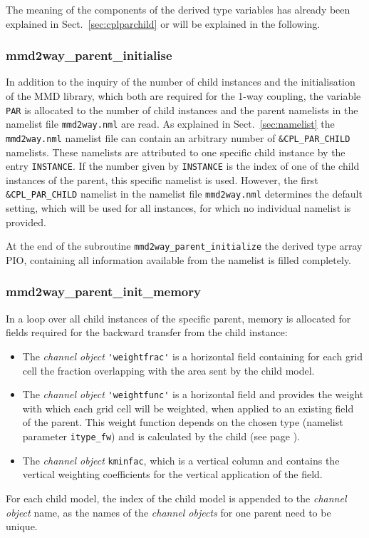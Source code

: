 \documentclass[11pt,twoside]{article}
\begin{document}
The meaning of the components of the derived type variables has already been
explained in Sect.\ \ref{sec:cplparchild} or will be explained in the following.

\subsubsection{mmd2way\_parent\_initialise}
In addition to the inquiry of the number of child instances and the
initialisation of the MMD library, which both are required for the 1-way
coupling, the variable \verb|PAR| is allocated to the number of child instances 
and the parent namelists in the namelist file \verb|mmd2way.nml|
are read.
As explained in Sect.\ \ref{sec:namelist} the \verb|mmd2way.nml| namelist file
can contain an arbitrary number of  \verb|&CPL_PAR_CHILD| namelists.
These namelists are attributed to one specific child instance by the
entry \verb|INSTANCE|. If the number given by \verb|INSTANCE| is the index of
one of the child instances of the 
parent, this specific namelist is used. However, the first \verb|&CPL_PAR_CHILD|
 namelist in the namelist file \verb|mmd2way.nml| determines the default
 setting, which will be used for all instances, for which no individual
 namelist is provided.

At the end of the subroutine \verb|mmd2way_parent_initialize| the derived
type array PIO, containing all information available from the namelist is
filled completely. 

\subsubsection{mmd2way\_parent\_init\_memory}
In a loop over all child instances of the specific parent,
memory is allocated for fields required for the backward transfer from
 the child instance:
\begin{itemize}
\item The {\it channel object} \verb|'weightfrac'| is a horizontal field
containing for each grid cell the fraction overlapping with the area sent 
by the child model.
\item The {\it channel object} \verb|'weightfunc'| is a horizontal field and 
provides the weight 
with which each grid cell will be weighted, when applied to an existing field
of the parent. This weight function depends on the chosen type
 (namelist parameter \verb|itype_fw|) and is calculated by the child
(see page \pageref{descript:itype_fw}).
\item The {\it channel object} \verb|kminfac|, which is a vertical column and
contains the vertical weighting coefficients for the vertical application of
the field. 
\end{itemize}
For each child model, the index of the child model is appended to the {\it
channel object} name, as the names of the {\it channel objects} for one parent
need to be unique.
\end{document}
